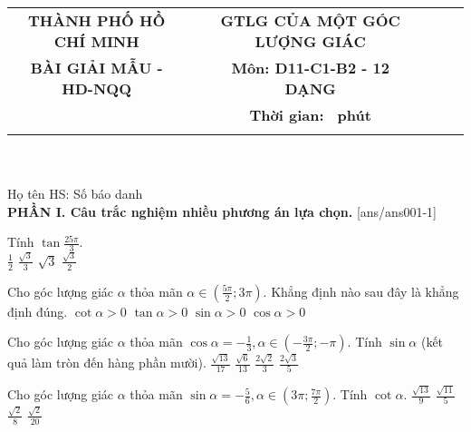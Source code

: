 \documentclass[12pt,a4paper]{article}
\newcommand{\tenso}{THÀNH PHỐ HỒ CHÍ MINH}
\newcommand{\tentruong}{BÀI GIẢI MẪU - HD-NQQ}
\newcommand{\tenkythi}{GTLG CỦA MỘT GÓC LƯỢNG GIÁC}
\newcommand{\tenmonthi}{Môn: D11-C1-B2 - 12 DẠNG}
\newcommand{\thoigian}{}
\newcommand{\tieude}[1]{
   \begin{tabular}{cm{0,2cm}cm{3cm}cm{3cm}}
    {\bf \tenso} & & {\bf \tenkythi} \\
    {\bf \tentruong} & & {\bf \tenmonthi}\\
    && {\bf Thời gian: \bf \thoigian \, phút}\\
    && { \fbox{\bf Mã đề: #1}}
   \end{tabular}\\\\
    
   {Họ tên HS: \dotfill Số báo danh \dotfill}\\
}
\newcommand{\chantrang}[2]{\rfoot{Trang \thepage $-$ Mã đề #2}}
\begin{document}


\tieude{001}
\chantrang{\pageref{LastPage}}{001}
\setcounter{page}{1}
{\bf PHẦN I. Câu trắc nghiệm nhiều phương án lựa chọn.}
\setcounter{ex}{0}
[ans/ans001-1]
\begin{ex}
 Tính $\tan\frac{25 \pi}{3}$.\\ 
\choice
{ $ \frac{1}{2} $ }
   { $ \frac{\sqrt{3}}{3} $ }
     { \True $ \sqrt{3} $ }
    { $ \frac{\sqrt{3}}{2} $ }
\loigiai{ 
  
 }\end{ex}

\begin{ex}
 Cho góc lượng giác ${\alpha}$ thỏa mãn $\alpha\in \left( \frac{5 \pi}{2};3\pi \right)$. Khẳng định nào sau đây là khẳng định đúng. 
\choice
{ $\cot \alpha >0$  }
   { $\tan \alpha >0$  }
     { \True $\sin \alpha >0$  }
    { $\cos \alpha >0$  }
\end{ex}

\begin{ex}
 Cho góc lượng giác $\alpha$ thỏa mãn $\cos \alpha=- \frac{1}{3}, \alpha \in \left( - \frac{3 \pi}{2};- \pi \right)$. Tính $\sin\alpha$ (kết quả làm tròn đến hàng phần mười). 
\choice
{ ${\frac{\sqrt{13}}{17}}$ }
   { ${\frac{\sqrt{6}}{13}}$ }
     { \True ${\frac{2 \sqrt{2}}{3}}$ }
    { ${\frac{2 \sqrt{3}}{5}}$ }
\end{ex}

\begin{ex}
 Cho góc lượng giác $\alpha$ thỏa mãn $\sin \alpha=- \frac{5}{6}, \alpha \in \left( 3 \pi;\frac{7 \pi}{2} \right)$. Tính $\cot\alpha$. 
\choice
{ $\frac{\sqrt{13}}{9}$ }
   { \True $\frac{\sqrt{11}}{5}$ }
     { $\frac{\sqrt{2}}{8}$ }
    { $\frac{\sqrt{2}}{20}$ }
\end{ex}
\end{document}
